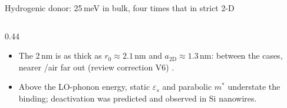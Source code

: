 \begin{frame}{Hydrogenic donor: 25\,meV in bulk, four times that in strict 2-D}
\begin{columns}[T,onlytextwidth]
\begin{column}{0.44\textwidth}
\begin{itemize}
        \item The 2\,nm \AlO{} is as thick as $r_0 \approx 2.1$\,nm and $a_{\mathrm{2D}} \approx 1.3$\,nm: between
          the cases, nearer \HfO{}/air far out (review correction V6) .
        \item Above the LO-phonon energy, static $\varepsilon_s$ and parabolic $m^*$ understate the binding;
          deactivation was predicted and observed in Si nanowires.
      \end{itemize}
    \end{column}
  \end{columns}
\end{frame}

